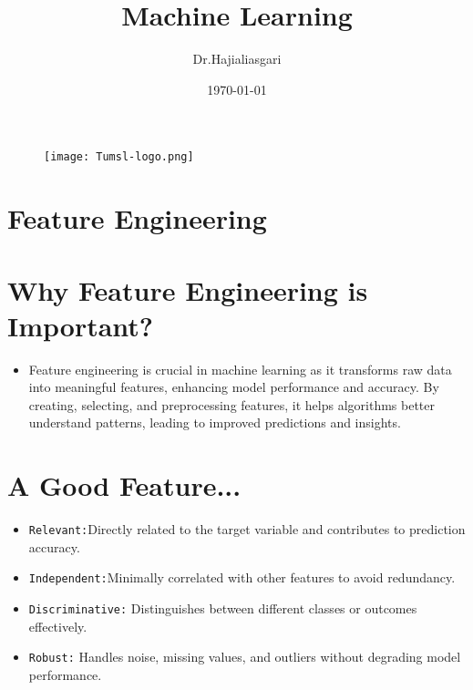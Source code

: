 \documentclass[serif, aspectratio=169]{beamer}
\author{Dr.Hajialiasgari}
\title{Machine Learning}
\institute{
    Tehran University \\
    Of\\
    Medical Science
}
\date{\small \today}
\begin{document}
\begin{frame}
    \titlepage
    \vspace*{-0.6cm}
    \begin{figure}[htpb]
        \begin{center}
            \texttt{[image: Tumsl-logo.png]}
        \end{center}
    \end{figure}
\end{frame}

\begin{frame}    
\tableofcontents[sectionstyle=show, subsectionstyle=show/shaded/hide, subsubsectionstyle=show/shaded/hide]
\end{frame}

\section{Feature Engineering}

\section{Why Feature Engineering is Important?}
\begin{frame}
    \begin{itemize}
        \item Feature engineering is crucial in machine learning as it transforms raw data into meaningful features, enhancing model performance and accuracy. By creating, selecting, and preprocessing features, it helps algorithms better understand patterns, leading to improved predictions and insights.
    \end{itemize}
\end{frame}


\section{A Good Feature...}

\begin{frame}
    \begin{itemize}  
        \item \texttt{\color{red}Relevant:}Directly related to the target variable and contributes to prediction accuracy.  
        \item \texttt{\color{red}Independent:}Minimally correlated with other features to avoid redundancy.  
        \item \texttt{\color{red}Discriminative:} Distinguishes between different classes or outcomes effectively.  
        \item \texttt{\color{red}Robust:} Handles noise, missing values, and outliers without degrading model performance.  
    \end{itemize}
\end{frame}
\end{document}

